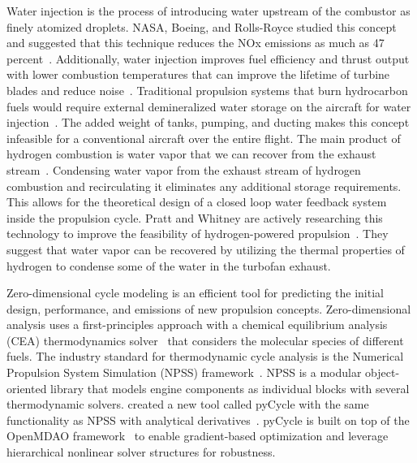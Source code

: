 \documentclass[conf]{new-aiaa}
\begin{document}
Water injection is the process of introducing water upstream of the combustor as finely atomized droplets.
NASA, Boeing, and Rolls-Royce studied this concept and suggested that this technique reduces the NOx emissions as much as 47 percent~\cite{Daggett2010}.
Additionally, water injection improves fuel efficiency and thrust output with lower combustion temperatures that can improve the lifetime of turbine blades and reduce noise~\cite{Daggett2010}.
Traditional propulsion systems that burn hydrocarbon fuels would require external demineralized water storage on the aircraft for water injection~\cite{Mourouzidis2015}.
The added weight of tanks, pumping, and ducting makes this concept infeasible for a conventional aircraft over the entire flight.
The main product of hydrogen combustion is water vapor that we can recover from the exhaust stream~\cite{Strom2002}.
Condensing water vapor from the exhaust stream of hydrogen combustion and recirculating it eliminates any additional storage requirements.
This allows for the theoretical design of a closed loop water feedback system inside the propulsion cycle.
Pratt and Whitney are actively researching this technology to improve the feasibility of hydrogen-powered propulsion~\cite{arpa-e_2021}.
They suggest that water vapor can be recovered by utilizing the thermal properties of hydrogen to condense some of the water in the turbofan exhaust.

Zero-dimensional cycle modeling is an efficient tool for predicting the initial design, performance, and emissions of new propulsion concepts.
Zero-dimensional analysis uses a first-principles approach with a chemical equilibrium analysis (CEA) thermodynamics solver~\cite{Gordon1994} that considers the molecular species of different fuels.
The industry standard for thermodynamic cycle analysis is the Numerical Propulsion System Simulation (NPSS) framework~\cite{JonesNPSS}.
NPSS is a modular object-oriented library that models engine components as individual blocks with several thermodynamic solvers.
\citet{Hendricks2019} created a new tool called pyCycle with the same functionality as NPSS with analytical derivatives~\cite{Gray2017b}.
pyCycle is built on top of the OpenMDAO framework~\cite{Gray2019a} to enable gradient-based optimization and leverage hierarchical nonlinear solver structures for robustness.
\end{document}
